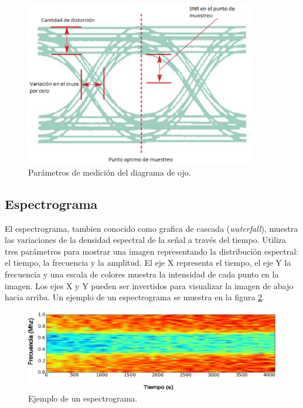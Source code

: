 \begin{figure}[hbp]
\centering
	\includegraphics[width=4in]{figs/eyeparams}
	\caption{Par\'ametros de medici\'on del diagrama de ojo.}
	\label{fig:eyeparams}
\end{figure}

\subsection{Espectrograma}
El espectrograma, tambien conocido como grafica de cascada (\emph{waterfall}), muestra las
variaciones de la densidad espectral de la se\~nal a trav\'es del tiempo. Utiliza tres par\'ametros
para mostrar una imagen representando la distribuci\'on espectral: el tiempo, la frecuencia y la
amplitud. El eje X representa el tiempo, el eje Y la frecuencia y una escala de colores muestra la
intensidad de cada punto en la imagen. Los ejes X y Y pueden ser invertidos para visualizar la
imagen de abajo hacia arriba. Un ejemplo de un espectrograma se muestra en la figura
\ref{fig:spectrogram}.

\begin{figure}[tp]
\centering
	\includegraphics[width=5.5in]{figs/spectrogram}
	\vspace{0.3in}
	\caption{Ejemplo de un espectrograma.}
	\label{fig:spectrogram}
\end{figure}

